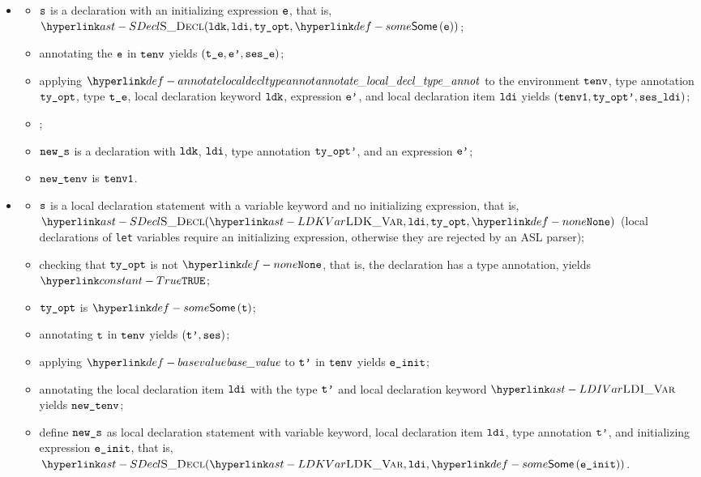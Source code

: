 \ProseParagraph
\OneApplies
\begin{itemize}
  \item {}
  \begin{itemize}
    \item $\texttt{s}$ is a declaration with an initializing expression $\texttt{e}$,
          that is, \\
          $\SDecl(\ldk, \ldi, \tyopt, \some{\ve})$;
    \item annotating the \rhsexpression{} $\texttt{e}$ in $\texttt{tenv}$ yields $(\texttt{t\_e},\texttt{e'}, \texttt{ses\_e})$\ProseOrTypeError;
    \item applying $\annotatelocaldecltypeannot$ to the environment $\texttt{tenv}$, type annotation $\texttt{ty\_opt}$, type $\texttt{t\_e}$, local declaration keyword $\texttt{ldk}$, expression $\texttt{e'}$, and local declaration item $\texttt{ldi}$ yields $(\texttt{tenv1}, \texttt{ty\_opt'}, \texttt{ses\_ldi})$\ProseOrTypeError;
    \item {};
    \item $\texttt{new\_s}$ is a declaration with $\texttt{ldk}$, $\texttt{ldi}$, type annotation $\texttt{ty\_opt'}$, and an expression $\texttt{e'}$;
    \item $\texttt{new\_tenv}$ is $\texttt{tenv1}$.
  \end{itemize}

  \item {}
  \begin{itemize}
  \item $\texttt{s}$ is a local declaration statement with a variable keyword and no initializing expression,
        that is, $\SDecl(\LDKVar, \ldi, \tyopt, \None)$ (local declarations of \texttt{let} variables require
        an initializing expression, otherwise they are rejected by an ASL parser);
  \item checking that $\texttt{ty\_opt}$ is not $\None$, that is, the declaration has a type annotation, yields $\True$\ProseOrTypeError;
  \item $\texttt{ty\_opt}$ is $\some{\vt}$;
  \item annotating $\texttt{t}$ in $\texttt{tenv}$ yields $(\texttt{t'}, \texttt{ses})$\ProseOrTypeError;
  \item applying $\basevalue$ to $\texttt{t'}$ in $\texttt{tenv}$ yields $\texttt{e\_init}$\ProseOrTypeError;
  \item annotating the local declaration item $\texttt{ldi}$ with the type $\texttt{t'}$ and local declaration keyword $\LDIVar$
        yields $\texttt{new\_tenv}$\ProseOrTypeError;
  \item define $\texttt{new\_s}$ as local declaration statement with variable keyword, local declaration item $\texttt{ldi}$, type annotation $\texttt{t'}$, and initializing expression $\texttt{e\_init}$, that is, $\SDecl(\LDKVar, \ldi, \some{\veinit})$.
  \end{itemize}
\end{itemize}

